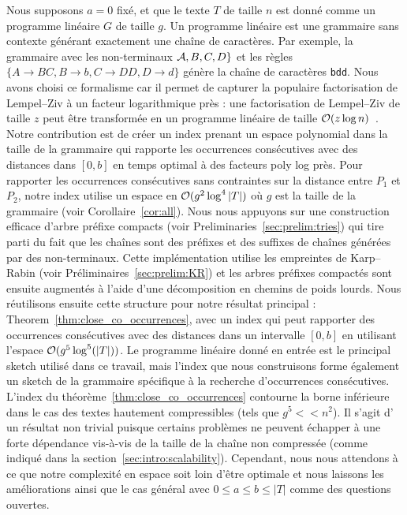 Nous supposons $a=0$ fixé, et que le texte $T$ de taille $n$ est donné comme un programme linéaire $G$ de taille $g$. Un programme linéaire est une grammaire sans contexte générant exactement une chaîne de caractères. Par exemple, la grammaire avec les non-terminaux $\mathcal{A},B,C,D\}$ et les règles $\{A \rightarrow BC, B \rightarrow b, C \rightarrow DD, D\rightarrow d \}$ génère la chaîne de caractères \texttt{bdd}.
Nous avons choisi ce formalisme car il permet de capturer la populaire factorisation de Lempel--Ziv à un facteur logarithmique près : une factorisation de Lempel--Ziv de taille $z$ peut être transformée en un programme linéaire de taille $\mathcal{O}(z\log n)$~\cite{CharikarLLPPRSS02,Rytter02}.
%
Notre contribution est de créer un index prenant un espace polynomial dans la taille de la grammaire qui rapporte les occurrences consécutives avec des distances dans $[0,b]$ en temps optimal à des facteurs poly log près.
Pour rapporter les occurrences consécutives sans contraintes sur la distance entre $P_1$ et $P_2$, notre index utilise un espace en $\mathcal{O}(g^2\log^4|T|)$ où $g$ est la taille de la grammaire (voir Corollaire~\ref{cor:all}).
%
Nous nous appuyons sur une construction efficace d'arbre préfixe compacts (voir Preliminaries~\ref{sec:prelim:tries}) qui tire parti du fait que les chaînes sont des préfixes et des suffixes de chaînes générées par des non-terminaux. Cette implémentation utilise les empreintes de Karp--Rabin (voir Préliminaires~\ref{sec:prelim:KR}) et les arbres préfixes compactés sont ensuite augmentés à l'aide d'une décomposition en chemins de poids lourds.
Nous réutilisons ensuite cette structure pour notre résultat principal : Theorem~\ref{thm:close_co_occurrences}, avec un index qui peut rapporter des occurrences consécutives avec des distances dans un intervalle $[0,b]$ en utilisant l'espace $\mathcal{O} (g^5\log^5(|T|))$.
%
Le programme linéaire donné en entrée est le principal sketch utilisé dans ce travail, mais l'index que nous construisons forme également un sketch de la grammaire spécifique à la recherche d'occurrences consécutives.
%
L'index du théorème~\ref{thm:close_co_occurrences} contourne la borne inférieure dans le cas des textes hautement compressibles (tels que $g^5 << n^2$). Il s'agit d' un résultat non trivial puisque certains problèmes ne peuvent échapper à une forte dépendance vis-à-vis de la taille de la chaîne non compressée (comme indiqué dans la section~\ref{sec:intro:scalability}). Cependant, nous nous attendons à ce que notre complexité en espace soit loin d'être optimale et nous laissons les améliorations ainsi que le cas général avec $0 \leq a \leq b \leq |T|$ comme des questions ouvertes.


